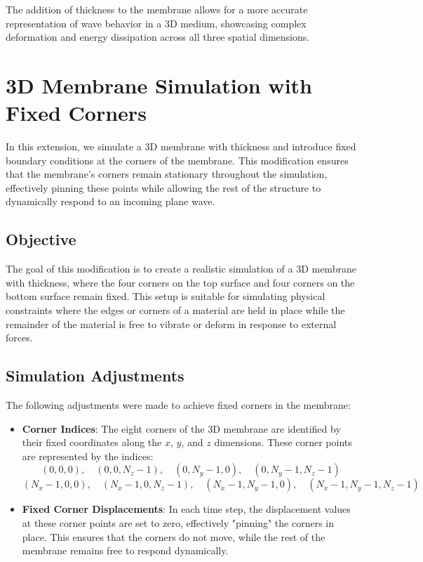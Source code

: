 \documentclass{article}
\begin{document}
The addition of thickness to the membrane allows for a more accurate representation of wave behavior in a 3D medium, showcasing complex deformation and energy dissipation across all three spatial dimensions.

\section{3D Membrane Simulation with Fixed Corners}

In this extension, we simulate a 3D membrane with thickness and introduce fixed boundary conditions at the corners of the membrane. This modification ensures that the membrane's corners remain stationary throughout the simulation, effectively pinning these points while allowing the rest of the structure to dynamically respond to an incoming plane wave.

\subsection{Objective}

The goal of this modification is to create a realistic simulation of a 3D membrane with thickness, where the four corners on the top surface and four corners on the bottom surface remain fixed. This setup is suitable for simulating physical constraints where the edges or corners of a material are held in place while the remainder of the material is free to vibrate or deform in response to external forces.

\subsection{Simulation Adjustments}

The following adjustments were made to achieve fixed corners in the membrane:

\begin{itemize}
    \item \textbf{Corner Indices}: The eight corners of the 3D membrane are identified by their fixed coordinates along the $x$, $y$, and $z$ dimensions. These corner points are represented by the indices:
    \[
    (0, 0, 0), \quad (0, 0, N_z - 1), \quad (0, N_y - 1, 0), \quad (0, N_y - 1, N_z - 1)
    \]
    \[
    (N_x - 1, 0, 0), \quad (N_x - 1, 0, N_z - 1), \quad (N_x - 1, N_y - 1, 0), \quad (N_x - 1, N_y - 1, N_z - 1)
    \]
    \item \textbf{Fixed Corner Displacements}: In each time step, the displacement values at these corner points are set to zero, effectively "pinning" the corners in place. This ensures that the corners do not move, while the rest of the membrane remains free to respond dynamically.
\end{itemize}
\end{document}
